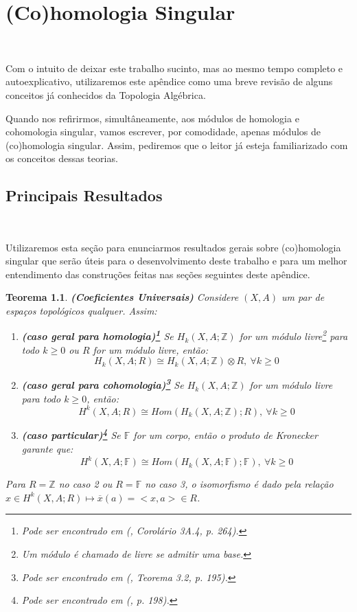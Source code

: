 \documentclass[12pt,oneside]{book} %
\newtheorem{teo}    {\hspace{0.5cm}Teorema}[chapter]
\newcommand{\Z}{\mathbb{Z}}
\newcommand{\F}{\mathbb{F}}
\newcommand{\tensor}{\otimes}
\begin{document}
\appendix %

\chapter{(Co)homologia Singular}\label{ap_(co)_sing}
\thispagestyle{empty}

\

\par Com o intuito de deixar este trabalho sucinto, mas ao mesmo tempo completo e autoexplicativo, utilizaremos este apêndice como uma breve revisão de alguns conceitos já conhecidos da Topologia Algébrica.

\par Quando nos refirirmos, simultâneamente, aos módulos de homologia e cohomologia singular, vamos escrever, por comodidade, apenas módulos de (co)homologia singular. Assim, pediremos que o leitor já esteja familiarizado com os conceitos dessas teorias.



\section{Principais Resultados}\label{ap_principais_res}

\

\par Utilizaremos esta seção para enunciarmos resultados gerais sobre (co)homologia singular que serão úteis para o desenvolvimento deste trabalho e para um melhor entendimento das construções feitas nas seções seguintes deste apêndice.

\begin{teo}{\bf (Coeficientes Universais)}
	Considere $(X,A)$ um par de espaços topológicos qualquer. Assim:
	\begin{enumerate}
		\item \textbf{(caso geral para homologia)\footnote{Pode ser encontrado em (\cite{hatcher}, Corolário 3A.4, p. 264).}} Se $H_{k}(X,A;\Z)$ for um módulo livre\footnote{Um módulo é chamado de livre se admitir uma base.} para todo $k\geq 0$ ou $R$ for um módulo livre, então: 
		$$ H_{k}(X,A;R)\cong H_{k}(X,A;\Z)\tensor R, \ \forall k\geq 0$$		
		\item \textbf{(caso geral para cohomologia)\footnote{Pode ser encontrado em (\cite{hatcher}, Teorema 3.2, p. 195).}} Se $H_{k}(X,A;\Z)$ for um módulo livre para todo $k\geq 0$, então:
		$$ H^{k}(X,A;R)\cong Hom(H_{k}(X,A;\Z);R), \ \forall k\geq 0 $$		
		\item \textbf{(caso particular)\footnote{Pode ser encontrado em (\cite{hatcher}, p. 198).}} Se $\mathbb{F}$ for um corpo, então o produto de Kronecker garante que:
		$$ H^{k}(X,A;\F)\cong Hom(H_{k}(X,A;\F);\F), \ \forall k\geq 0 $$ 
	\end{enumerate}
	\par Para $R=\Z$ no caso 2 ou $R=\F$ no caso 3, o isomorfismo é dado pela relação $x\in H^{k}(X,A;R)\mapsto\overline{x}(a)=<x,a>\in R$.
\end{teo}
\end{document}
